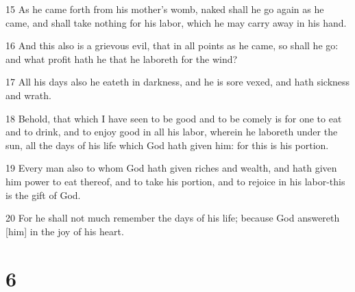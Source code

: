 \par 15 As he came forth from his mother's womb, naked shall he go again as he came, and shall take nothing for his labor, which he may carry away in his hand.
\par 16 And this also is a grievous evil, that in all points as he came, so shall he go: and what profit hath he that he laboreth for the wind?
\par 17 All his days also he eateth in darkness, and he is sore vexed, and hath sickness and wrath.
\par 18 Behold, that which I have seen to be good and to be comely is for one to eat and to drink, and to enjoy good in all his labor, wherein he laboreth under the sun, all the days of his life which God hath given him: for this is his portion.
\par 19 Every man also to whom God hath given riches and wealth, and hath given him power to eat thereof, and to take his portion, and to rejoice in his labor-this is the gift of God.
\par 20 For he shall not much remember the days of his life; because God answereth [him] in the joy of his heart.

\chapter{6}

